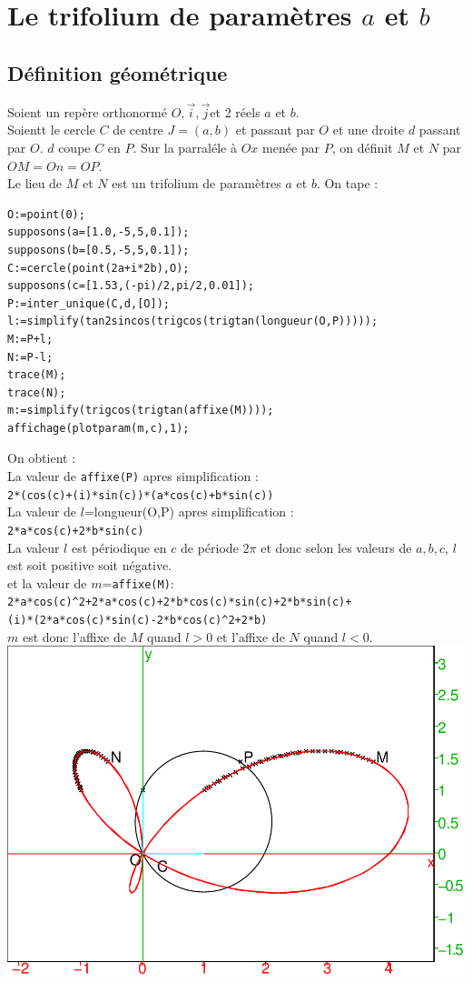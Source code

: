\documentclass[a4paper,11pt]{book}
\begin{document}
\section{Le trifolium de param\`etres $a$ et $b$}
\subsection{D\'efinition g\'eom\'etrique}
Soient un rep\`ere orthonorm\'e  $O,\overrightarrow{i},\overrightarrow{j}$et 2 r\'eels $a$ et $b$.\\
Soientt le cercle $C$ de centre $J=(a,b)$ et passant par $O$ et une droite $d$ 
passant par $O$. $d$ coupe $C$ en $P$. Sur la parral\'ele \`a $Ox$ men\'ee par 
$P$, on d\'efinit $M$ et $N$ par $OM=On=OP$.\\
Le lieu de $M$ et $N$ est un trifolium de param\`etres $a$ et $b$.
On tape  :
\begin{verbatim}
O:=point(0);
supposons(a=[1.0,-5,5,0.1]);
supposons(b=[0.5,-5,5,0.1]);
C:=cercle(point(2a+i*2b),O);
supposons(c=[1.53,(-pi)/2,pi/2,0.01]);
P:=inter_unique(C,d,[O]);
l:=simplify(tan2sincos(trigcos(trigtan(longueur(O,P)))));
M:=P+l;
N:=P-l;
trace(M);
trace(N);
m:=simplify(trigcos(trigtan(affixe(M))));
affichage(plotparam(m,c),1);
\end{verbatim}
 On obtient :\\
 La valeur de {\tt affixe(P)} apres simplification :\\
{\tt 2*(cos(c)+(i)*sin(c))*(a*cos(c)+b*sin(c))}\\
La valeur de $l$={longueur(O,P)} apres simplification :\\
 {\tt 2*a*cos(c)+2*b*sin(c)}\\
La valeur $l$ est p\'eriodique en $c$ de p\'eriode $2\pi$ et donc selon les 
valeurs de $a,b,c$, $l$ est soit positive soit n\'egative.\\
et la valeur de $m$={\tt affixe(M)}:\\
{\tt 2*a*cos(c)\verb|^|2+2*a*cos(c)+2*b*cos(c)*sin(c)+2*b*sin(c)+\\
(i)*(2*a*cos(c)*sin(c)-2*b*cos(c)\verb|^|2+2*b)}\\
$m$ est donc l'affixe de $M$ quand $l>0$ et l'affixe de $N$ quand $l<0$.\\
\includegraphics[width=\textwidth]{trifolium}\\
\end{document}
